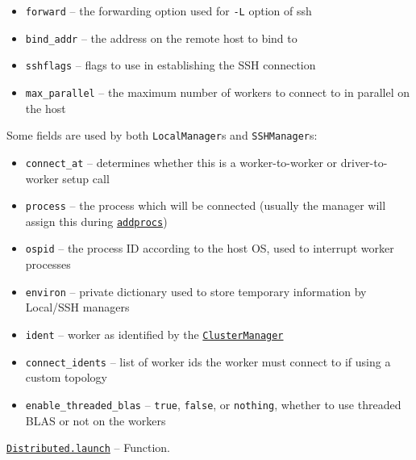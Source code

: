 \begin{adjustwidth}{2em}{0pt}
\begin{itemize}
\item \texttt{forward} – the forwarding option used for \texttt{-L} option of ssh


\item \texttt{bind\_addr} – the address on the remote host to bind to


\item \texttt{sshflags} – flags to use in establishing the SSH connection


\item \texttt{max\_parallel} – the maximum number of workers to connect to in parallel on the host

\end{itemize}
Some fields are used by both \texttt{LocalManager}s and \texttt{SSHManager}s:

\begin{itemize}
\item \texttt{connect\_at} – determines whether this is a worker-to-worker or driver-to-worker setup call


\item \texttt{process} – the process which will be connected (usually the manager will assign this during \hyperlink{2657399037748470653}{\texttt{addprocs}})


\item \texttt{ospid} – the process ID according to the host OS, used to interrupt worker processes


\item \texttt{environ} – private dictionary used to store temporary information by Local/SSH managers


\item \texttt{ident} – worker as identified by the \hyperlink{1673650075671996993}{\texttt{ClusterManager}}


\item \texttt{connect\_idents} – list of worker ids the worker must connect to if using a custom topology


\item \texttt{enable\_threaded\_blas} – \texttt{true}, \texttt{false}, or \texttt{nothing}, whether to use threaded BLAS or not on the workers

\end{itemize}


\end{adjustwidth}
\hypertarget{7346188534454273843}{}
\hyperlink{7346188534454273843}{\texttt{Distributed.launch}}  -- {Function.}

